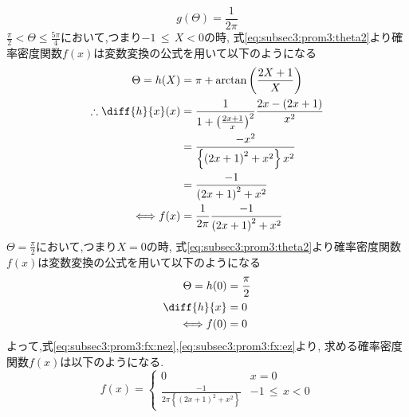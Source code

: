 \documentclass[dvipdfmx,titlepage, 11pt, a4paper]{jsarticle}%
\begin{document}
\begin{enumerate}[(1)]
  \begin{equation*}
    g(\Theta) = \frac{1}{2\pi}
  \end{equation*}
  $\frac{\pi}{2} < \Theta \leq \frac{5\pi}{4}$において,つまり$ -1\, \leq\, X < 0$の時,
  式\eqref{eq:subsec3:prom3:theta2}より確率密度関数$f(x)$は変数変換の公式を用いて以下のようになる
  \begin{align}
    \Theta = h(X) &= \pi + \arctan\left(\frac{2X + 1}{X}\right) \nonumber\\
    \therefore \diff{h}{x}(x) &= \frac{1}{1 + \left(\frac{2x + 1}{x}\right)^2}\frac{2x - (2x + 1)}{x^2}\nonumber\\
                  &= \frac{-x^2}{\left\{\left(2x + 1\right)^2 + x^2\right\}x^2}\nonumber\\
                  &= \frac{-1}{\left(2x + 1\right)^2 + x^2}\nonumber\\
    \Longleftrightarrow 
    f(x) &= \frac{1}{2\pi}\frac{-1}{\left(2x + 1\right)^2 + x^2}\label{eq:subsec3:prom3:fx:nez}
  \end{align}
  $\Theta = \frac{\pi}{2}$において,つまり$X = 0$の時,
  式\eqref{eq:subsec3:prom3:theta2}より確率密度関数$f(x)$は変数変換の公式を用いて以下のようになる
  \begin{align}
    \Theta = h(0) &= \frac{\pi}{2}\nonumber\\
    \diff{h}{x} &= 0\nonumber\\
    \Longleftrightarrow f(0) &= 0\label{eq:subsec3:prom3:fx:ez}
  \end{align}
  よって,式\eqref{eq:subsec3:prom3:fx:nez},\eqref{eq:subsec3:prom3:fx:ez}より, 求める確率密度関数$f(x)$は以下のようになる.
  \begin{equation*}
    f(x) = 
    \begin{cases}
      0 & x = 0\\
      \frac{-1}{2\pi\left\{\left(2x + 1\right)^2 + x^2\right\}} & -1\, \leq\, x < 0
    \end{cases}
  \end{equation*}
  \vspace{0.7cm}
  

\end{enumerate}
\end{document}
